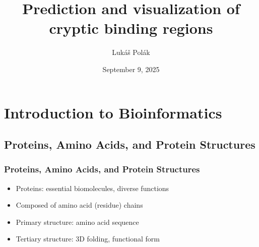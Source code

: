 \documentclass[aspectratio=169]{beamer}
\title[PredictionAndVisualization]{Prediction and visualization of cryptic binding regions}
\author[Polak L.]{Lukáš Polák}
\institute[CUNI]{Faculty of Mathematics and Physics, Charles University}
\date{September 9, 2025}
\begin{document}


\begin{frame}[plain]
  \titlepage
\end{frame}








\section{Introduction to Bioinformatics}

\subsection{Proteins, Amino Acids, and Protein Structures}

\begin{frame}
  \frametitle{Proteins, Amino Acids, and Protein Structures}

  \begin{itemize}
    \item Proteins: essential biomolecules, diverse functions
    \item Composed of amino acid (residue) chains
    \item Primary structure: amino acid sequence
    \item Tertiary structure: 3D folding, functional form
  \end{itemize}

\end{frame}
\end{document}
